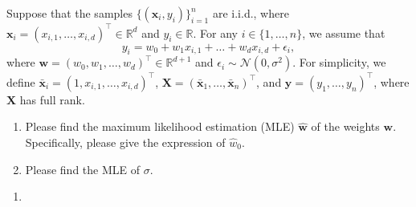 \documentclass[11pt,letter,notitlepage]{article}
\begin{document}
\newpage



\begin{exercise}\label{Exe5}
Suppose that the samples $\{(\mathbf{x}_i,y_i)\}^n_{i=1}$ are i.i.d., where $\mathbf{x}_i =(x_{i,1}, \dots, x_{i,d})^{\top} \in \mathbb{R}^d$  and $y_i \in \mathbb{R}$. For any $i\in \{1,\dots, n\}$, we assume that 
$$y_i =  w_0 + w_1 x_{i,1} +\dots + w_d x_{i,d} + \epsilon_i,$$
where $\mathbf{w} = (w_0,w_1,\dots,w_d)^{\top}\in \mathbb{R}^{d+1}$ and $\epsilon_i\sim \mathcal{N}(0,\sigma^2)$. For simplicity, we define $\bar{\mathbf{x}}_i = (1, x_{i,1}, \dots, x_{i,d})^\top$, $ \mathbf{X}=(\bar{\mathbf{x}}_1,\dots,\bar{\mathbf{x}}_n)^\top$, and $\mathbf{y}=(y_1,\dots,y_n)^\top$, where $\mathbf{X}$ has full rank.
\begin{enumerate}
    \item Please find the maximum likelihood estimation (MLE) $\hat{\mathbf{w}}$ of the weights $\mathbf{w}$. Specifically, please give the expression of $\hat{w}_0$.
    \item Please find the MLE of $\sigma$.
\end{enumerate}
\end{exercise}
\begin{solution}
	\begin{enumerate}
	 \item 
	 
	\end{enumerate}

\end{solution}

\newpage
\end{document}
